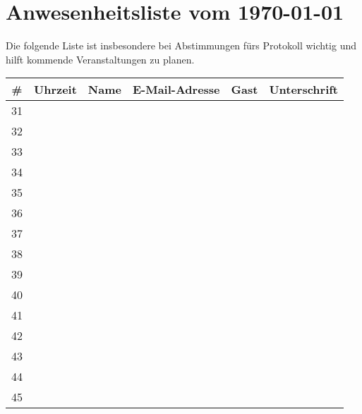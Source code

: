 \documentclass[a4paper]{scrartcl}
\newcommand\datum{\today}  %
\begin{document}
\section*{Anwesenheitsliste vom \datum} %

Die folgende Liste ist insbesondere bei Abstimmungen fürs Protokoll
wichtig und hilft kommende Veranstaltungen zu planen.

\begin{tabular}{c|p{2cm}|p{5cm}|p{5cm}|l|p{5cm}}
\toprule
\textbf{\#} & \textbf{Uhrzeit} & \textbf{Name} & \textbf{E-Mail-Adresse} & \textbf{Gast}  & \textbf{Unterschrift} \\\hline\hline
31 & ~       & ~    & ~       & ~                          & ~            \\[1.2cm]\hline
32 &~       & ~    & ~       & ~                           & ~            \\[1.2cm]\hline
33 &~       & ~    & ~       & ~                           & ~            \\[1.2cm]\hline
34 &~       & ~    & ~       & ~                           & ~            \\[1.2cm]\hline
35 &~       & ~    & ~       & ~                           & ~            \\[1.2cm]\hline
36 &~       & ~    & ~       & ~                           & ~            \\[1.2cm]\hline
37 &~       & ~    & ~       & ~                           & ~            \\[1.2cm]\hline
38 &~       & ~    & ~       & ~                           & ~            \\[1.2cm]\hline
39 &~       & ~    & ~       & ~                           & ~            \\[1.2cm]\hline
40 &~       & ~    & ~       & ~                           & ~            \\[1.2cm]\hline
41 &~       & ~    & ~       & ~                           & ~            \\[1.2cm]\hline
42 &~       & ~    & ~       & ~                           & ~            \\[1.2cm]\hline
43 &~       & ~    & ~       & ~                           & ~            \\[1.2cm]\hline
44 &~       & ~    & ~       & ~                           & ~            \\[1.2cm]\hline
45 &~       & ~    & ~       & ~                           & ~            \\[1.2cm]
\bottomrule
\end{tabular}
\clearpage
\end{document}
